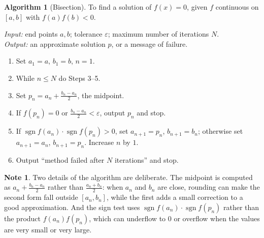\documentclass[11pt,a4paper]{article}
\numberwithin{equation}{section}
\DeclareMathOperator{\sgn}{sgn}
\theoremstyle{definition}
\newtheorem{alg}[thm]{Algorithm}
\newtheorem*{note}{Note}
\begin{document}
\begin{alg}[Bisection]
\label{alg:bisection}
To find a solution of $f(x) = 0$, given $f$ continuous on $[a,b]$ with $f(a)f(b)<0$.

\emph{Input:} end points $a, b$; tolerance $\varepsilon$; maximum number of iterations $N$.\\
\emph{Output:} an approximate solution $p$, or a message of failure.
\begin{enumerate}[label=Step \arabic*:,leftmargin=*]
\item Set $a_1 = a$, $b_1 = b$, $n = 1$.
\item While $n\leq N$ do Steps 3--5.
\item Set $p_n = a_n+\frac{b_n-a_n}{2}$, the midpoint.
\item If $f(p_n) = 0$ or $\frac{b_n-a_n}{2}<\varepsilon$, output $p_n$ and stop.
\item If $\sgn f(a_n)\cdot\sgn f(p_n)>0$, set $a_{n+1} = p_n$, $b_{n+1} = b_n$; otherwise set $a_{n+1} = a_n$, $b_{n+1} = p_n$. Increase $n$
by $1$.
\item Output ``method failed after $N$ iterations'' and stop.
\end{enumerate}
\end{alg}

\begin{note}
Two details of the algorithm are deliberate. The midpoint is computed as $a_n+\frac{b_n-a_n}{2}$ rather than $\frac{a_n+b_n}{2}$: when $a_n$ and
$b_n$ are close, rounding can make the second form fall outside $[a_n,b_n]$, while the first adds a small correction to a good
approximation. And the sign test uses $\sgn f(a_n)\cdot\sgn f(p_n)$ rather than the product $f(a_n)f(p_n)$, which can underflow to $0$
or overflow when the values are very small or very large.
\end{note}
\end{document}
